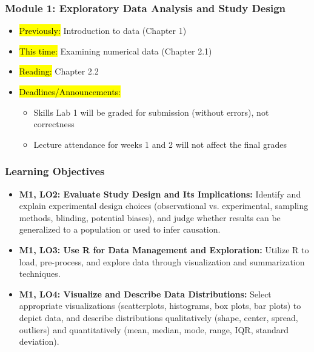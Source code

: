 
\begin{frame}
    \frametitle{Module 1: Exploratory Data Analysis and Study Design}
    \begin{itemize}
        \item \hl{Previously: }Introduction to data (Chapter 1)
        \item \hl{This time: }Examining numerical data (Chapter 2.1)
        \item \hl{Reading: }Chapter 2.2
        \item \hl{Deadlines/Announcements: }
        \begin{itemize}
            \item Skills Lab 1 will be graded for submission (without errors), not correctness
            \item Lecture attendance for weeks 1 and 2 will not affect the final grades
        \end{itemize}
    \end{itemize}

\end{frame}

\begin{frame}
    \frametitle{Learning Objectives}
    \begin{itemize}
        \item \textbf{M1, LO2: Evaluate Study Design and Its Implications:} Identify and explain experimental design choices (observational vs. experimental, sampling methods, blinding, potential biases), and judge whether results can be generalized to a population or used to infer causation.
        \item \textbf{M1, LO3: Use R for Data Management and Exploration:} Utilize R to load, pre-process, and explore data through visualization and summarization techniques.
        \item \textbf{M1, LO4: Visualize and Describe Data Distributions:} Select appropriate visualizations (scatterplots, histograms, box plots, bar plots) to depict data, and describe distributions qualitatively (shape, center, spread, outliers) and quantitatively (mean, median, mode, range, IQR, standard deviation).
    \end{itemize}
\end{frame}
